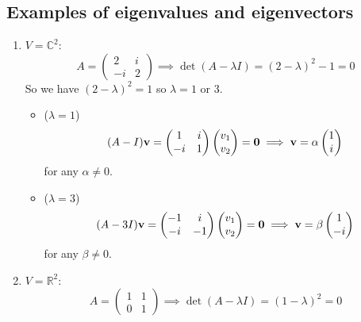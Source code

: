 \subsection{Examples of eigenvalues and eigenvectors}
\begin{enumerate}
	\item \(V = \mathbb C^2\):
	      \[
		      A = \begin{pmatrix}
			      2 & i \\ -i & 2
		      \end{pmatrix} \implies \det(A - \lambda I) = (2-\lambda)^2 - 1 = 0
	      \]
	      So we have \((2 - \lambda)^2 = 1\) so \(\lambda = 1\) or 3.
	      \begin{itemize}
		      \item (\(\lambda = 1\))
		            \[
			            (A - I)\vb v = \begin{pmatrix}
				            1 & i \\ -i & 1
			            \end{pmatrix}\begin{pmatrix}
				            v_1 \\ v_2
			            \end{pmatrix} = \vb 0 \implies \vb v = \alpha\begin{pmatrix}
				            1 \\ i
			            \end{pmatrix}
		            \]
		            for any \(\alpha \neq 0\).
		      \item (\(\lambda = 3\))
		            \[
			            (A - 3I)\vb v = \begin{pmatrix}
				            -1 & i \\ -i & -1
			            \end{pmatrix}\begin{pmatrix}
				            v_1 \\ v_2
			            \end{pmatrix} = \vb 0 \implies \vb v = \beta\begin{pmatrix}
				            1 \\ -i
			            \end{pmatrix}
		            \]
		            for any \(\beta \neq 0\).
	      \end{itemize}
	\item \(V = \mathbb R^2\):
	      \[
		      A = \begin{pmatrix}
			      1 & 1 \\ 0 & 1
		      \end{pmatrix} \implies \det(A - \lambda I) = (1-\lambda)^2 = 0
\]
\end{enumerate}

